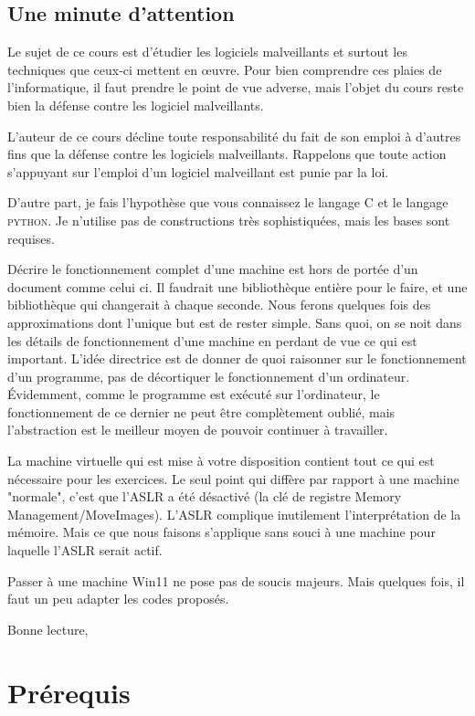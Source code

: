 \documentclass{book}
\newcommand{\python}{\textsc{python}\xspace}
\newcommand{\C}{\textsc{C}\xspace}
\begin{document}
	
\section*{Une minute d'attention}

Le sujet de ce cours est d'étudier les logiciels malveillants et surtout les techniques que ceux-ci mettent en \oe uvre. Pour bien comprendre ces plaies de l'informatique, il faut prendre le point de vue adverse, mais l'objet du cours reste bien la défense contre les logiciel malveillants. 

L'auteur de ce cours décline toute responsabilité du fait de son emploi à d'autres fins que la défense contre les logiciels malveillants. Rappelons que toute action s'appuyant sur l'emploi d'un logiciel malveillant est punie par la loi. 

D'autre part, je fais l'hypothèse que vous connaissez le langage \C et le langage \python. Je n'utilise pas de constructions très sophistiquées, mais les bases sont requises.

Décrire le fonctionnement complet d'une machine est hors de portée d'un document comme celui ci. Il faudrait une bibliothèque entière pour le faire, et une bibliothèque qui changerait à chaque seconde. Nous ferons  quelques fois des approximations dont l'unique but est de rester simple. Sans quoi, on se noit dans les détails de fonctionnement d'une machine en perdant de vue ce qui est important. L'idée directrice est de donner de quoi raisonner sur le fonctionnement d'un programme, pas de décortiquer le fonctionnement d'un ordinateur. \'Evidemment, comme le programme est exécuté sur l'ordinateur, le fonctionnement de ce dernier ne peut être complètement oublié, mais l'abstraction est le meilleur moyen de pouvoir continuer à travailler.

La machine virtuelle qui est mise à votre disposition contient tout ce qui est nécessaire pour les exercices. Le seul point qui diffère par rapport à une machine "normale", c'est que l'ASLR a été désactivé (la clé de registre Memory Management/MoveImages). L'ASLR complique inutilement l'interprétation de la mémoire. Mais ce que nous faisons s'applique sans souci à une machine pour laquelle l'ASLR serait actif.

Passer à une machine Win11 ne pose pas de soucis majeurs. Mais quelques fois, il faut un peu adapter les codes proposés. 

\medskip
Bonne lecture,


\chapter{Prérequis}
\end{document}
